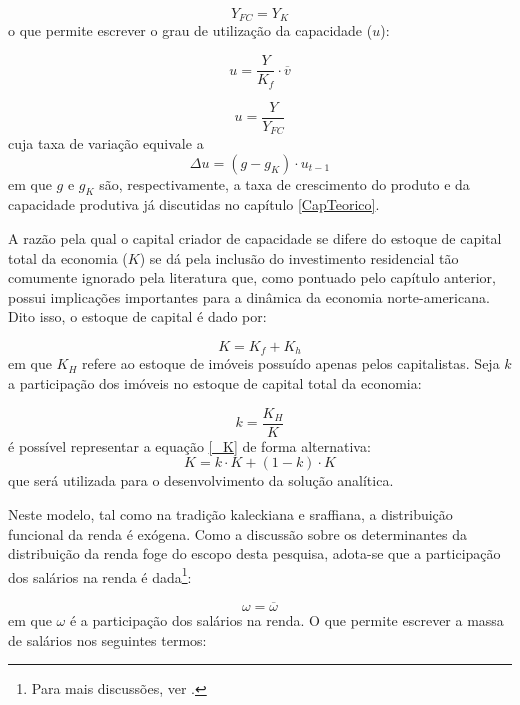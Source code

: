 \begin{equation}
\label{_YFC}
    Y_{FC} = Y_K
\end{equation}
o que permite escrever o grau de utilização da capacidade ($u$):

$$
u = \frac{Y}{K_f}\cdot \overline v
$$

\begin{equation}
\label{_u}
    u = \frac{Y}{Y_{FC}}
\end{equation}
cuja taxa de variação equivale a
\begin{equation}
\label{Aux}
\Delta u = (g - g_K)\cdot u_{t-1}
\end{equation}
em que $g$ e $g_K$ são, respectivamente, a taxa de crescimento do produto e da capacidade produtiva já discutidas no capítulo \ref{CapTeorico}.

A razão pela qual o capital criador de capacidade se difere do estoque de capital total da economia ($K$) se dá pela inclusão do investimento residencial tão comumente ignorado pela literatura que, como pontuado pelo capítulo anterior, possui implicações importantes para a dinâmica da economia norte-americana. Dito isso, o estoque de capital é dado por:

\begin{equation}
\label{_K}
    K = K_f + K_h
\end{equation}
em que $K_H$ refere ao estoque de imóveis possuído apenas pelos capitalistas. Seja $k$ a participação dos imóveis no estoque de capital total da economia:

\begin{equation}
\label{_tau}
k = \frac{K_H}{K}    
\end{equation}
é possível representar a equação \ref{_K} de forma alternativa:
$$
K = k\cdot K + (1-k)\cdot K
$$
que será utilizada para o desenvolvimento da solução analítica.

Neste modelo, tal como na tradição kaleckiana e sraffiana, a distribuição funcional da renda é exógena. Como a discussão sobre os determinantes da distribuição da renda foge do escopo desta pesquisa, adota-se que a participação dos salários na renda é dada\footnote{Para mais discussões, ver \textcite{pivetti_essay_1992}.}:

\begin{equation}
    \omega = \overline{\omega}
\end{equation}
em que $\omega$ é a participação dos salários na renda. O que permite escrever a massa de salários nos seguintes termos:

